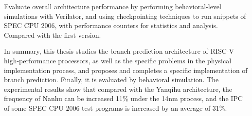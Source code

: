 {    Evaluate overall architecture performance by performing behavioral-level simulations with Verilator, and using checkpointing techniques to run snippets of SPEC CPU 2006, with performance counters for statistics and analysis. Compared with the first version. 

    In summary, this thesis studies the branch prediction architecture of RISC-V high-performance processors, as well as the specific problems in the physical implementation process, and proposes and completes a specific implementation of branch prediction. Finally, it is evaluated by behavioral simulation. The experimental results show that compared with the Yanqihu architecture, the frequency of Nanhu can be increased 11\% under the 14nm process, and the IPC of some SPEC CPU 2006 test programs is increased by an average of 31\%. 

}



\makeenabstract
